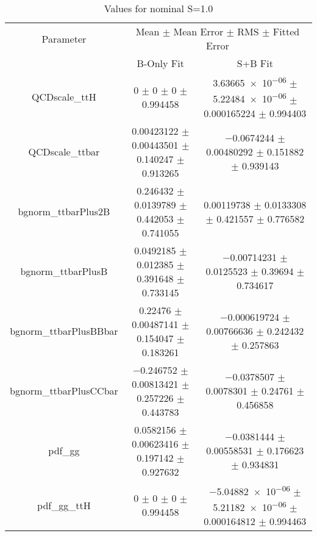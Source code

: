 \begin{table}
\centering
\caption{Values for nominal S=1.0}
\begin{tabular}{ccc}
\toprule
Parameter & \multicolumn{2}{c}{Mean $\pm$ Mean Error $\pm$ RMS $\pm$ Fitted Error}\\
 & B-Only Fit & S+B Fit\\
\midrule
QCDscale\_ttH & \num{0} $\pm$ \num{0} $\pm$ \num{0} $\pm$ \num{0.994458} & \num{3.63665e-06} $\pm$ \num{5.22484e-06} $\pm$ \num{0.000165224} $\pm$ \num{0.994403}\\
QCDscale\_ttbar & \num{0.00423122} $\pm$ \num{0.00443501} $\pm$ \num{0.140247} $\pm$ \num{0.913265} & \num{-0.0674244} $\pm$ \num{0.00480292} $\pm$ \num{0.151882} $\pm$ \num{0.939143}\\
bgnorm\_ttbarPlus2B & \num{0.246432} $\pm$ \num{0.0139789} $\pm$ \num{0.442053} $\pm$ \num{0.741055} & \num{0.00119738} $\pm$ \num{0.0133308} $\pm$ \num{0.421557} $\pm$ \num{0.776582}\\
bgnorm\_ttbarPlusB & \num{0.0492185} $\pm$ \num{0.012385} $\pm$ \num{0.391648} $\pm$ \num{0.733145} & \num{-0.00714231} $\pm$ \num{0.0125523} $\pm$ \num{0.39694} $\pm$ \num{0.734617}\\
bgnorm\_ttbarPlusBBbar & \num{0.22476} $\pm$ \num{0.00487141} $\pm$ \num{0.154047} $\pm$ \num{0.183261} & \num{-0.000619724} $\pm$ \num{0.00766636} $\pm$ \num{0.242432} $\pm$ \num{0.257863}\\
bgnorm\_ttbarPlusCCbar & \num{-0.246752} $\pm$ \num{0.00813421} $\pm$ \num{0.257226} $\pm$ \num{0.443783} & \num{-0.0378507} $\pm$ \num{0.0078301} $\pm$ \num{0.24761} $\pm$ \num{0.456858}\\
pdf\_gg & \num{0.0582156} $\pm$ \num{0.00623416} $\pm$ \num{0.197142} $\pm$ \num{0.927632} & \num{-0.0381444} $\pm$ \num{0.00558531} $\pm$ \num{0.176623} $\pm$ \num{0.934831}\\
pdf\_gg\_ttH & \num{0} $\pm$ \num{0} $\pm$ \num{0} $\pm$ \num{0.994458} & \num{-5.04882e-06} $\pm$ \num{5.21182e-06} $\pm$ \num{0.000164812} $\pm$ \num{0.994463}\\
\bottomrule
\end{tabular}
\end{table}
